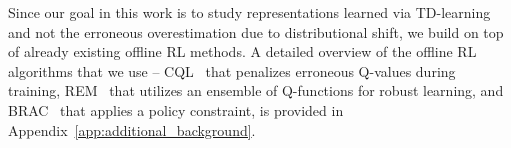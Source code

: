 Since our goal in this work is to study representations learned via TD-learning and not the erroneous overestimation due to distributional shift, we build on top of already existing offline RL methods. A detailed overview of the offline RL algorithms that we use -- CQL~\citep{kumar2020conservative} that penalizes erroneous Q-values during training, REM~\citep{agarwal2019optimistic} that utilizes an ensemble of Q-functions for robust learning, and BRAC~\citep{wu2019behavior} that applies a policy constraint, is provided in Appendix~\ref{app:additional_background}. 



